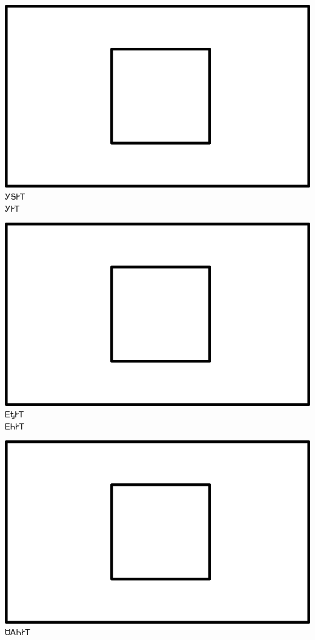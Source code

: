 \documentclass[avery5371]{flashcards}%
\begin{document}
\begin{flashcard}{
\includegraphics[width=0.95\columnwidth,height=.51\columnwidth,keepaspectratio]{../artwork/for-colors/square-white}
}\Huge ᎩᎦᎨᎢ\\ᎩᎨᎢ
\end{flashcard}

\begin{flashcard}{
\includegraphics[width=0.95\columnwidth,height=.51\columnwidth,keepaspectratio]{../artwork/for-colors/square-white}
}\Huge ᎬᎿᎨᎢ\\ᎬᏂᎨᎢ
\end{flashcard}

\begin{flashcard}{
\includegraphics[width=0.95\columnwidth,height=.51\columnwidth,keepaspectratio]{../artwork/for-colors/square-white}
}\Huge ᏌᎪᏂᎨᎢ
\end{flashcard}
\end{document}
